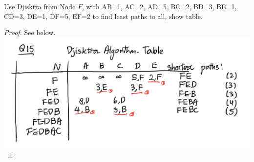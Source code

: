 \documentclass[./answersheet.tex]{subfiles}
\begin{document}
\begin{wts}
    Use Djisktra from Node $F$, with  AB=1, AC=2, AD=5, BC=2, BD=3, BE=1, CD=3, DE=1, DF=5, EF=2 to find least paths to all, show table.
\end{wts}
\begin{proof}
    See below.\\
    \includegraphics[width=\columnwidth]{./q15.jpg}
\end{proof}
\end{document}

